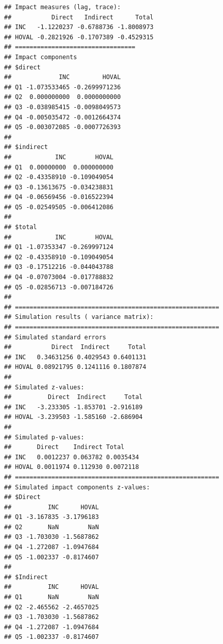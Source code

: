 \begin{knitrout}
\color{fgcolor}\begin{kframe}
\begin{alltt}
   \hlkwb{<-}     \hlstd{=} \hlstd{,}  \hlstd{=} \hlstd{)}
 \hlkwb{<-}   \hlstd{=} \hlstd{,}  \hlstd{=} \hlstd{,}  \hlstd{=}  \hlstd{)}
\end{alltt}
\begin{verbatim}
## Impact measures (lag, trace):
##           Direct   Indirect      Total
## INC   -1.1220237 -0.6788736 -1.8008973
## HOVAL -0.2821926 -0.1707389 -0.4529315
## =================================
## Impact components
## $direct
##             INC         HOVAL
## Q1 -1.073533465 -0.2699971236
## Q2  0.000000000  0.0000000000
## Q3 -0.038985415 -0.0098049573
## Q4 -0.005035472 -0.0012664374
## Q5 -0.003072085 -0.0007726393
## 
## $indirect
##            INC        HOVAL
## Q1  0.00000000  0.000000000
## Q2 -0.43358910 -0.109049054
## Q3 -0.13613675 -0.034238831
## Q4 -0.06569456 -0.016522394
## Q5 -0.02549505 -0.006412086
## 
## $total
##            INC        HOVAL
## Q1 -1.07353347 -0.269997124
## Q2 -0.43358910 -0.109049054
## Q3 -0.17512216 -0.044043788
## Q4 -0.07073004 -0.017788832
## Q5 -0.02856713 -0.007184726
## 
## ========================================================
## Simulation results ( variance matrix):
## ========================================================
## Simulated standard errors
##           Direct  Indirect     Total
## INC   0.34631256 0.4029543 0.6401131
## HOVAL 0.08921795 0.1241116 0.1807874
## 
## Simulated z-values:
##          Direct  Indirect     Total
## INC   -3.233305 -1.853701 -2.916189
## HOVAL -3.239503 -1.585160 -2.686904
## 
## Simulated p-values:
##       Direct    Indirect Total    
## INC   0.0012237 0.063782 0.0035434
## HOVAL 0.0011974 0.112930 0.0072118
## ========================================================
## Simulated impact components z-values:
## $Direct
##          INC      HOVAL
## Q1 -3.167835 -3.1796183
## Q2       NaN        NaN
## Q3 -1.703030 -1.5687862
## Q4 -1.272087 -1.0947684
## Q5 -1.002337 -0.8174607
## 
## $Indirect
##          INC      HOVAL
## Q1       NaN        NaN
## Q2 -2.465562 -2.4657025
## Q3 -1.703030 -1.5687862
## Q4 -1.272087 -1.0947684
## Q5 -1.002337 -0.8174607

\end{verbatim}
\end{kframe}
\end{knitrout}
